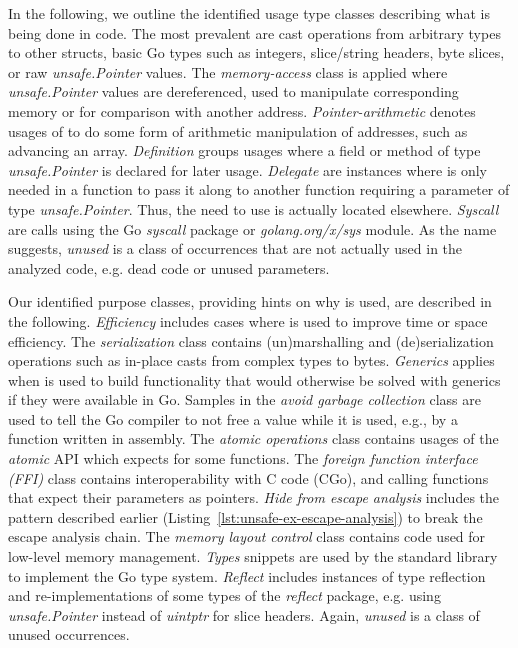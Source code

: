 In the following, we outline the identified usage type classes describing what is being done in code.
The most prevalent are cast operations from arbitrary types to other structs, basic Go types such as integers, slice/string headers, byte slices, or raw \textit{unsafe.Pointer} values. 
The \textit{memory-access} class is applied where \textit{unsafe.Pointer} values are dereferenced, used to manipulate corresponding memory or for comparison with another address.
\textit{Pointer-arithmetic} denotes usages of \unsafe{} to do some form of arithmetic manipulation of addresses, such as advancing an array.
\textit{Definition} groups usages where a field or method of type \textit{unsafe.Pointer} is declared for later usage.
\textit{Delegate} are instances where \unsafe{} is only needed in a function to pass it along to another function requiring a parameter of type \textit{unsafe.Pointer}. 
Thus, the need to use \unsafe{} is actually located elsewhere.
\textit{Syscall} are calls using the Go \textit{syscall} package or \textit{golang.org/x/sys} module.
As the name suggests, \textit{unused} is a class of occurrences that are not actually used in the analyzed code, e.g. dead code or unused parameters.

Our identified purpose classes, providing hints on why \unsafe{} is used, are described in the following.
\textit{Efficiency} includes cases where \unsafe{} is used to improve time or space efficiency.
The \textit{serialization} class contains (un)marshalling and (de)serialization operations such as in-place casts from complex types to bytes.
\textit{Generics} applies when \unsafe{} is used to build functionality that would otherwise be solved with generics if they were available in Go.
Samples in the \textit{avoid garbage collection} class are used to tell the Go compiler to not free a value while it is used, e.g., by a function written in assembly.
The \textit{atomic operations} class contains usages of the \textit{atomic} API which expects \unsafe{} for some functions.
The \textit{foreign function interface (FFI)} class contains interoperability with C code (CGo), and calling  functions that expect their parameters as \unsafe{} pointers.
\textit{Hide from escape analysis} includes the pattern described earlier (Listing~\ref{lst:unsafe-ex-escape-analysis}) to break the escape analysis chain.
The \textit{memory layout control} class contains code used for low-level memory management.
\textit{Types} snippets are used by the standard library to implement the Go type system.
\textit{Reflect} includes instances of type reflection and re-implementations of some types of the \textit{reflect} package, e.g. using \textit{unsafe.Pointer} instead of \textit{uintptr} for slice headers.
Again, \textit{unused} is a class of unused occurrences.

